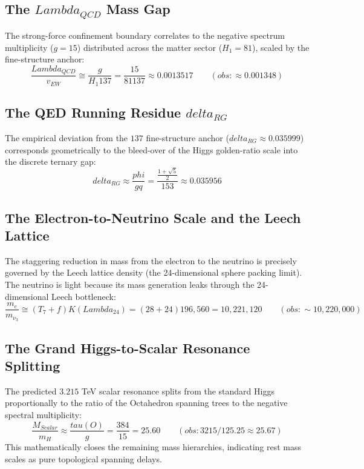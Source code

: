 \documentclass[12pt,a4paper]{article}
\def\mathrm#1{#1}%
\def\text#1{#1}%
\def\delta{delta}%
\def\Lambda{Lambda}%
\def\phi{phi}%
\def\tau{tau}%
\def\cdot{ }%
\theoremstyle{definition}
\newcommand{\vEW}{v_{\mathrm{EW}}}
\begin{document}
\subsection{\texorpdfstring{The $\Lambda_{\text{QCD}}$ Mass Gap}{The Lambda_QCD Mass Gap}}
The strong-force confinement boundary correlates to the negative spectrum multiplicity ($g=15$) distributed across the matter sector ($H_1=81$), scaled by the fine-structure anchor:
\begin{equation}
\frac{\Lambda_{\text{QCD}}}{\vEW} \cong \frac{g}{H_1 \cdot 137} = \frac{15}{81 \cdot 137} \approx 0.0013517 \qquad (\text{obs: } \approx 0.001348)
\end{equation}

\subsection{\texorpdfstring{The QED Running Residue $\delta_{\text{RG}}$}{The QED Running Residue delta_RG}}
The empirical deviation from the $137$ fine-structure anchor ($\delta_{\text{RG}} \approx 0.035999$) corresponds geometrically to the bleed-over of the Higgs golden-ratio scale into the discrete ternary gap:
\begin{equation}
\delta_{\text{RG}} \approx \frac{\phi}{g \cdot q} = \frac{\frac{1+\sqrt{5}}{2}}{15 \cdot 3} \approx 0.035956
\end{equation}

\subsection{The Electron-to-Neutrino Scale and the Leech Lattice}
The staggering reduction in mass from the electron to the neutrino is precisely governed by the Leech lattice density (the 24-dimensional sphere packing limit). The neutrino is light because its mass generation leaks through the 24-dimensional Leech bottleneck:
\begin{equation}
\frac{m_e}{m_{\nu_3}} \cong (T_7 + f) \cdot K(\Lambda_{24}) = (28 + 24) \cdot 196{,}560 = 10{,}221{,}120 \qquad (\text{obs: } \sim 10{,}220{,}000)
\end{equation}

\subsection{The Grand Higgs-to-Scalar Resonance Splitting}
The predicted $3.215$ TeV scalar resonance splits from the standard Higgs proportionally to the ratio of the Octahedron spanning trees to the negative spectral multiplicity:
\begin{equation}
\frac{M_{\text{Scalar}}}{m_H} \approx \frac{\tau(O)}{g} = \frac{384}{15} = 25.60 \qquad (\text{obs: } 3215/125.25 \approx 25.67)
\end{equation}
This mathematically closes the remaining mass hierarchies, indicating rest mass scales as pure topological spanning delays.
\end{document}
